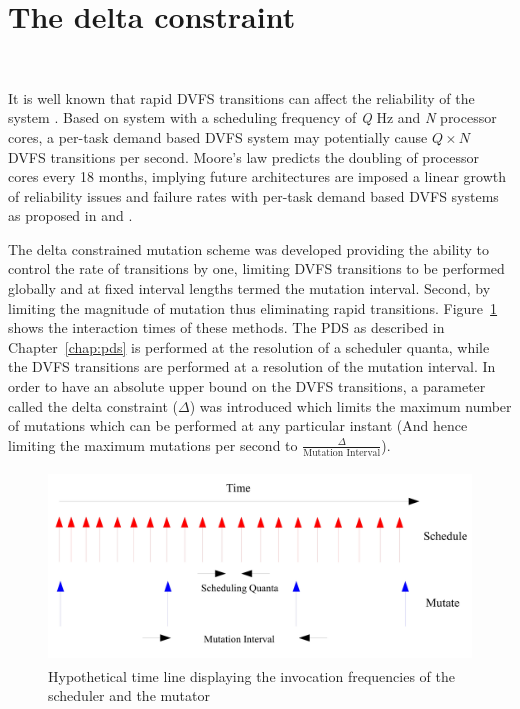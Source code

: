 \section{The delta constraint}~\label{sec:delta_constraint}


It is well known that rapid DVFS transitions can affect the reliability of the system \cite{ImpactDVFS}.
Based on system with a scheduling frequency of \textit{Q} Hz
and \textit{N} processor cores, a per-task demand based DVFS system may potentially cause $Q \times N$ 
DVFS transitions per second. Moore's law predicts the doubling of processor cores every 18 months, implying
future architectures are imposed a linear growth of reliability issues and failure rates with per-task
demand based DVFS systems as proposed in \cite{LiveRuntime} and \cite{Phaseaware}. 

The delta constrained mutation scheme was developed providing the ability to control the rate of transitions
by one, limiting DVFS transitions to be performed globally and at fixed interval lengths termed the mutation
interval. Second, by limiting the magnitude of mutation thus eliminating rapid transitions.
Figure~\ref{fig:schedule_mutate} shows the interaction times of these methods. 
The PDS as described in Chapter~\ref{chap:pds} is performed at the resolution of a scheduler quanta, while
the DVFS transitions are performed at a resolution of the mutation interval. In order to have an absolute
upper bound on the DVFS transitions, a parameter called the delta constraint ($\Delta$) was introduced
which limits the maximum number of mutations which can be performed at any particular instant (And hence
limiting the maximum mutations per second to $\frac{\Delta}{\text{Mutation Interval}}$). 

\begin{figure}[h!]
  \begin{center}
    \includegraphics[height=2in]{figures/Schedule_Mutate.jpg}%
    \caption{Hypothetical time line displaying the invocation frequencies of the scheduler and the mutator}
    \label{fig:schedule_mutate}
  \end{center}
\end{figure}


